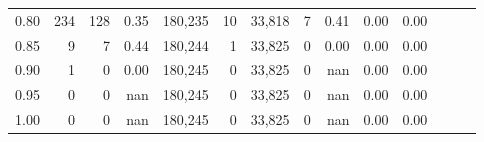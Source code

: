\begin{tabular}{rrrrrrrrrrrrrr}
0.80 &     234 &    128 &  0.35 &  180,235 &       10 &  33,818 &       7 &  0.41 &  0.00 &      0.00 \\
0.85 &       9 &      7 &  0.44 &  180,244 &        1 &  33,825 &       0 &  0.00 &  0.00 &      0.00 \\
0.90 &       1 &      0 &  0.00 &  180,245 &        0 &  33,825 &       0 &   nan &  0.00 &      0.00 \\
0.95 &       0 &      0 &   nan &  180,245 &        0 &  33,825 &       0 &   nan &  0.00 &      0.00 \\
1.00 &       0 &      0 &   nan &  180,245 &        0 &  33,825 &       0 &   nan &  0.00 &      0.00 \\
\bottomrule
\end{tabular}
